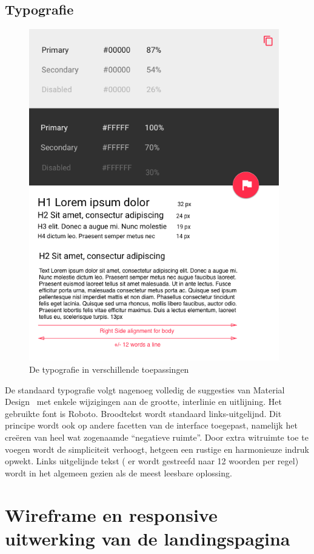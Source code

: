 \documentclass{article}
\begin{document}
\begin{appendices}
\subsection{Typografie}
\begin{figure}[!h]
\centering
 \includegraphics[width=109mm]{pieteruploads/SKRBL_FRNT_typography.png}
 \caption{De typografie in verschillende toepassingen}
\end{figure}

De standaard typografie volgt nagenoeg volledig de suggesties van Material Design~\cite{website:Material} met enkele wijzigingen aan de grootte, interlinie en uitlijning. Het gebruikte font is Roboto. Broodtekst wordt standaard links-uitgelijnd. Dit principe wordt ook op andere facetten van de interface toegepast, namelijk het creëren van heel wat zogenaamde “negatieve ruimte”. Door extra witruimte toe te voegen wordt de simpliciteit verhoogt, hetgeen een rustige en harmonieuze indruk opwekt. Links uitgelijnde tekst ( er wordt gestreefd naar 12 woorden per regel)  wordt in het algemeen gezien als de meest leesbare oplossing.

\clearpage

\section{Wireframe en responsive uitwerking van de landingspagina}


\end{appendices}
\end{document}
